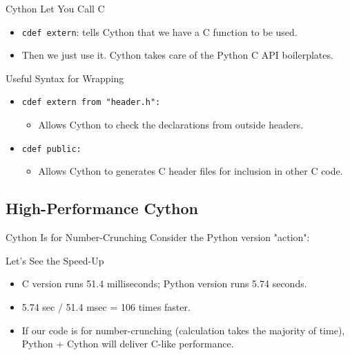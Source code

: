 \documentclass[dvips,xcolor=pst,14pt]{beamer}
\begin{document}
\begin{frame}[fragile]{
%
Cython Let You Call C
%
}

\begin{itemize}
\item \verb+cdef extern+: tells Cython that we have a C function to be used.
\item Then we just use it.  Cython takes care of the Python C API boilerplates.
\end{itemize}
\end{frame}

\begin{frame}[fragile]{
%
Useful Syntax for Wrapping
%
}
\begin{itemize}
\item \verb+cdef extern from "header.h":+
\begin{itemize}
  \item Allows Cython to check the declarations from outside headers.
\end{itemize}
\item \verb+cdef public:+
\begin{itemize}
  \item Allows Cython to generates C header files for inclusion in other C
  code.
\end{itemize}
\end{itemize}
\end{frame}

\subsection{
High-Performance Cython
}

\begin{frame}[fragile]{
%
Cython Is for Number-Crunching
%
}
Consider the Python version "action":

\end{frame}

\begin{frame}[fragile]{
%
Let's See the Speed-Up
%
}
\begin{itemize}
\item C version runs 51.4 milliseconds; Python version runs 5.74 seconds.
\item 5.74 sec / 51.4 msec = 106 times faster.
\item If our code is for number-crunching (calculation takes the majority of
time), Python + Cython will deliver C-like performance.
\end{itemize}
\end{frame}
\end{document}
